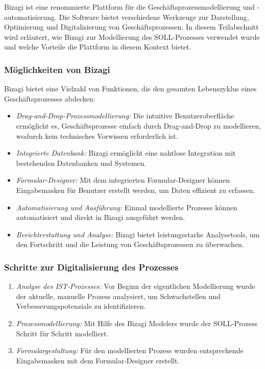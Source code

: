 \documentclass[12pt, a4paper]{article}
\begin{document}
Bizagi ist eine renommierte Plattform für die Geschäftsprozessmodellierung und -automatisierung. Die Software bietet verschiedene Werkzeuge zur Darstellung, 
Optimierung und Digitalisierung von Geschäftsprozessen. In diesem Teilabschnitt wird erläutert, wie Bizagi zur Modellierung des SOLL-Prozesses verwendet wurde und welche 
Vorteile die Plattform in diesem Kontext bietet.

\subsubsection{Möglichkeiten von Bizagi}

Bizagi bietet eine Vielzahl von Funktionen, die den gesamten Lebenszyklus eines Geschäftsprozesses abdecken:

\begin{itemize}
\item \textit{Drag-and-Drop-Prozessmodellierung:} Die intuitive Benutzeroberfläche ermöglicht es, Geschäftsprozesse einfach durch Drag-and-Drop zu modellieren, 
wodurch kein technisches Vorwissen erforderlich ist.
\item \textit{Integrierte Datenbank:} Bizagi ermöglicht eine nahtlose Integration mit bestehenden Datenbanken und Systemen.
\item \textit{Formular-Designer:} Mit dem integrierten Formular-Designer können Eingabemasken für Benutzer erstellt werden, um Daten effizient zu erfassen.
\item \textit{Automatisierung und Ausführung:} Einmal modellierte Prozesse können automatisiert und direkt in Bizagi ausgeführt werden.
\item \textit{Berichterstattung und Analyse:} Bizagi bietet leistungsstarke Analysetools, um den Fortschritt und die Leistung von Geschäftsprozessen zu überwachen.
\end{itemize}

\subsubsection{Schritte zur Digitalisierung des Prozesses}

\begin{enumerate}
\item \textit{Analyse des IST-Prozesses:} Vor Beginn der eigentlichen Modellierung wurde der aktuelle, manuelle Prozess analysiert, um Schwachstellen und 
Verbesserungspotenziale zu identifizieren.
\item \textit{Prozessmodellierung:} Mit Hilfe des Bizagi Modelers wurde der SOLL-Prozess Schritt für Schritt modelliert.
\item \textit{Formulargestaltung:} Für den modellierten Prozess wurden entsprechende Eingabemasken mit dem Formular-Designer erstellt.
\end{enumerate}
\end{document}
